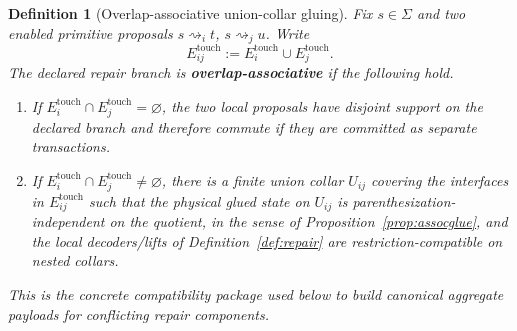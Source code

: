 \documentclass[11pt]{article}
\newtheorem{definition}[theorem]{Definition}
\theoremstyle{remark}
\theoremstyle{plain}
\begin{document}
\begin{definition}[Overlap-associative union-collar gluing]\label{def:assoc}
Fix \(s\in\Sigma\) and two enabled primitive proposals \(s\rightsquigarrow_i t\),
\(s\rightsquigarrow_j u\). Write
\[
E_{ij}^{\mathrm{touch}}
:=
E_i^{\mathrm{touch}}\cup E_j^{\mathrm{touch}}.
\]
The declared repair branch is \textbf{overlap-associative} if the following hold.
\begin{enumerate}[label=(\roman*),leftmargin=2em]
\item If \(E_i^{\mathrm{touch}}\cap E_j^{\mathrm{touch}}=\varnothing\), the two local proposals
have disjoint support on the declared branch and therefore commute if they are committed as
separate transactions.
\item If \(E_i^{\mathrm{touch}}\cap E_j^{\mathrm{touch}}\neq\varnothing\), there is a finite union
collar \(U_{ij}\) covering the interfaces in \(E_{ij}^{\mathrm{touch}}\) such that the physical
glued state on \(U_{ij}\) is parenthesization-independent on the quotient, in the sense of
Proposition~\ref{prop:assocglue}, and the local decoders/lifts of
Definition~\ref{def:repair} are restriction-compatible on nested collars.
\end{enumerate}
This is the concrete compatibility package used below to build canonical aggregate payloads for
conflicting repair components.
\end{definition}
\end{document}
